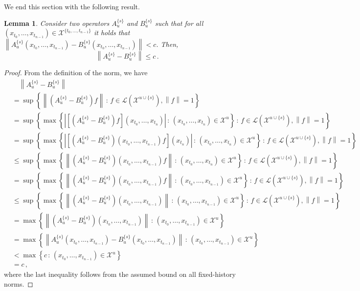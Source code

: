 \documentclass[a4paper,reqno]{amsart}
\newtheorem{lemma}[theorem]{Lemma}
\newcommand{\states}{\mathcal{X}}
\newcommand{\gambles}{\mathcal{L}}
\newcommand{\norm}[1]{\left\lVert #1 \right\rVert}
\begin{document}
We end this section with the following result.
\begin{lemma}\label{lemma:nonmarkov_fixedhistory_bound_to_global_bound}
Consider two operators $A_u^{\{s\}}$ and $B_u^{\{s\}}$ such that for all $(x_{t_0},\ldots,x_{t_{n-1}})\in\states^{\{t_0,\ldots,t_{n-1}\}}$ it holds that $\norm{A_u^{\{s\}}(x_{t_0},\ldots,x_{t_{n-1}}) - B_u^{\{s\}}(x_{t_0},\ldots,x_{t_{n-1}})} < c$. Then,
\begin{equation*}
\norm{A_u^{\{s\}} - B_u^{\{s\}}} \leq c\,.
\end{equation*}
\end{lemma}
\begin{proof}
From the definition of the norm, we have
\begin{align*}
&\quad\norm{A_u^{\{s\}} - B_u^{\{s\}}} \\
&= \sup\left\{\norm{\left(A_u^{\{s\}} - B_u^{\{s\}}\right)f}\,:\,f\in\gambles(\states^{u\cup\{s\}}),\norm{f}=1\right\} \\
&= \sup\left\{\max\left\{\left\vert \left[\left(A_u^{\{s\}} - B_u^{\{s\}}\right)f\right](x_{t_0},\ldots,x_{t_n}) \right\vert\,:\,(x_{t_0},\ldots,x_{t_n})\in\states^u\right\}\,:\,f\in\gambles(\states^{u\cup\{s\}}),\norm{f}=1\right\} \\
&= \sup\left\{\max\left\{\left\vert \left[\left(A_u^{\{s\}} - B_u^{\{s\}}\right)(x_{t_0},\ldots,x_{t_{n-1}})f\right](x_{t_n}) \right\vert\,:\,(x_{t_0},\ldots,x_{t_n})\in\states^u\right\}\,:\,f\in\gambles(\states^{u\cup\{s\}}),\norm{f}=1\right\} \\
&\leq \sup\left\{\max\left\{\norm{ \left(A_u^{\{s\}} - B_u^{\{s\}}\right)(x_{t_0},\ldots,x_{t_{n-1}})f} \,:\,(x_{t_0},\ldots,x_{t_n})\in\states^u\right\}\,:\,f\in\gambles(\states^{u\cup\{s\}}),\norm{f}=1\right\} \\
&= \sup\left\{\max\left\{\norm{ \left(A_u^{\{s\}} - B_u^{\{s\}}\right)(x_{t_0},\ldots,x_{t_{n-1}})f} \,:\,(x_{t_0},\ldots,x_{t_{n-1}})\in\states^u\right\}\,:\,f\in\gambles(\states^{u\cup\{s\}}),\norm{f}=1\right\} \\
&\leq \sup\left\{\max\left\{\norm{ \left(A_u^{\{s\}} - B_u^{\{s\}}\right)(x_{t_0},\ldots,x_{t_{n-1}})} \,:\,(x_{t_0},\ldots,x_{t_{n-1}})\in\states^u\right\}\,:\,f\in\gambles(\states^{u\cup\{s\}}),\norm{f}=1\right\} \\
&= \max\left\{\norm{ \left(A_u^{\{s\}} - B_u^{\{s\}}\right)(x_{t_0},\ldots,x_{t_{n-1}})} \,:\,(x_{t_0},\ldots,x_{t_{n-1}})\in\states^u\right\} \\
&= \max\left\{\norm{ A_u^{\{s\}}(x_{t_0},\ldots,x_{t_{n-1}}) - B_u^{\{s\}}(x_{t_0},\ldots,x_{t_{n-1}})} \,:\,(x_{t_0},\ldots,x_{t_{n-1}})\in\states^u\right\} \\
&< \max\left\{c \,:\,(x_{t_0},\ldots,x_{t_{n-1}})\in\states^u\right\} \\
&= c\,,
\end{align*}
where the last inequality follows from the assumed bound on all fixed-history norms.
\end{proof}
\end{document}
